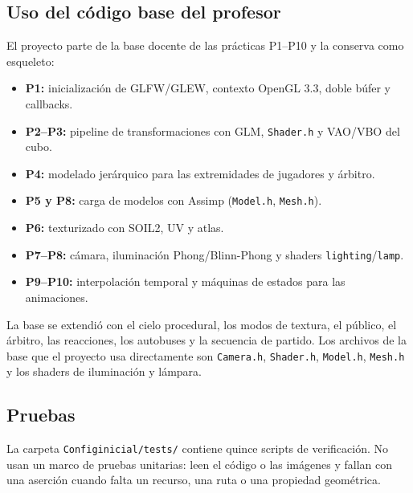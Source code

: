 \documentclass[12pt,letterpaper]{article}
\begin{document}
\subsection{Uso del código base del profesor}
El proyecto parte de la base docente de las prácticas P1--P10 y la conserva como esqueleto:
\begin{itemize}
  \item \textbf{P1:} inicialización de GLFW/GLEW, contexto OpenGL 3.3, doble búfer y callbacks.
  \item \textbf{P2--P3:} pipeline de transformaciones con GLM, \texttt{Shader.h} y VAO/VBO del cubo.
  \item \textbf{P4:} modelado jerárquico para las extremidades de jugadores y árbitro.
  \item \textbf{P5 y P8:} carga de modelos con Assimp (\texttt{Model.h}, \texttt{Mesh.h}).
  \item \textbf{P6:} texturizado con SOIL2, UV y atlas.
  \item \textbf{P7--P8:} cámara, iluminación Phong/Blinn-Phong y shaders \texttt{lighting}/\texttt{lamp}.
  \item \textbf{P9--P10:} interpolación temporal y máquinas de estados para las animaciones.
\end{itemize}
La base se extendió con el cielo procedural, los modos de textura, el público, el árbitro, las
reacciones, los autobuses y la secuencia de partido. Los archivos de la base que el proyecto usa
directamente son \texttt{Camera.h}, \texttt{Shader.h}, \texttt{Model.h}, \texttt{Mesh.h} y los shaders
de iluminación y lámpara.

\subsection{Pruebas}
La carpeta \texttt{Configinicial/tests/} contiene quince scripts de verificación. No usan un marco de
pruebas unitarias: leen el código o las imágenes y fallan con una aserción cuando falta un recurso,
una ruta o una propiedad geométrica.
\end{document}
